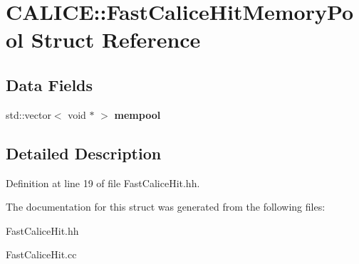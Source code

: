 \section{C\-A\-L\-I\-C\-E\-:\-:Fast\-Calice\-Hit\-Memory\-Pool Struct Reference}
\label{structCALICE_1_1FastCaliceHitMemoryPool}
\subsection*{Data Fields}
\begin{DoxyCompactItemize}
\item 
std\-::vector$<$ void $\ast$ $>$ {\bfseries mempool}\label{structCALICE_1_1FastCaliceHitMemoryPool_affd31a4d5638893942e4f690a862b078}

\end{DoxyCompactItemize}


\subsection{Detailed Description}


Definition at line 19 of file Fast\-Calice\-Hit.\-hh.



The documentation for this struct was generated from the following files\-:\begin{DoxyCompactItemize}
\item 
Fast\-Calice\-Hit.\-hh\item 
Fast\-Calice\-Hit.\-cc\end{DoxyCompactItemize}

